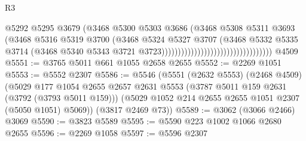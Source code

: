 \begin{lexlean}{R3}
\begin{coremodule}
                                                            @5292
                                                            @5295
                                                            @3679
                                                            (@3468
                                                              @5300
                                                              @5303
                                                              @3686
                                                              (@3468
                                                                @5308
                                                                @5311
                                                                @3693
                                                                (@3468
                                                                  @5316
                                                                  @5319
                                                                  @3700
                                                                  (@3468
                                                                    @5324
                                                                    @5327
                                                                    @3707
                                                                    (@3468
                                                                      @5332
                                                                      @5335
                                                                      @3714
                                                                      (@3468
                                                                        @5340
                                                                        @5343
                                                                        @3721
                                                                        @3723))))))))))))))))))))))))))))))))))
    @4509
@5551 := @3765 @5011 @661 @1055 @2658 @2655
@5552 := @2269 @1051
@5553 := @5552 @2307
@5586 := @5546
    (@5551
      (@2632 @5553)
      (@2468 @4509)
      (@5029
        @177
        @1054
        @2655
        @2657
        @2631
        @5553
        (@3787 @5011 @159 @2631 (@3792 (@3793 @5011 @159)))
        (@5029 @1052 @214 @2655 @2655 @1051 @2307 (@5050 @1051) @5069))
      (@3817 @2469 @73))
@5589 := @3062 (@3066 @2466) @3069
@5590 := @3823 @5589
@5595 := @5590 @223 @1002 @1066 @2680 @2655
@5596 := @2269 @1058
@5597 := @5596 @2307

\end{coremodule}
\end{lexlean}
